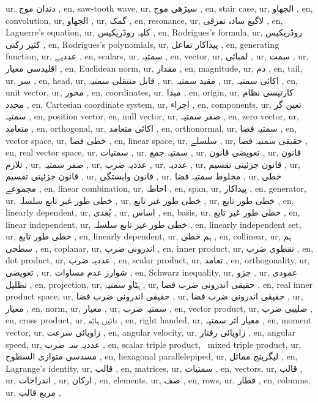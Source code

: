 ur, دندان موج ,
en, saw-tooth wave,
ur, سیڑھی موج ,
en, stair case,
ur, الجھاو ,
en, convolution,
ur, الجھاو ,
ur, گمک ,
en, resonance,
ur, لاگیغ سادہ تفرقی ,
en, Laguerre's equation,
ur, کلیہ روڈریکیس ,
en, Rodrigues's formula,
ur, روڈریکیس کثیر رکنی ,
en, Rodrigues's polynomials,
ur, پیداکار تفاعل ,
en, generating function,
ur, عددیے ,
en, scalars,
ur, سمتیہ ,
en, vector,
ur, لمبائی ,
ur, سمت ,
ur, اقلیدسی معیار ,
en, Euclidean norm,
ur, مقدار ,
en, magnitude,
ur, دم ,
en, tail,
ur, سر ,
en, head,
ur, قابل منتقلی سمتیہ ,
ur, مقید سمتیہ ,
ur, اکائی سمتیہ ,
en, unit vector,
ur, محور ,
en, coordinates,
ur, مبدا ,
en, origin,
ur, کارتیسی نظام محدد ,
en, Cartesian coordinate system,
ur, اجزاء ,
en, components,
ur, تعین گر سمتیہ ,
en, position vector,
en, null vector,
ur, صفر سمتیہ ,
en, zero vector,
ur, متعامد ,
en, orthogonal,
ur,  اکائی متعامد ,
en, orthonormal,
ur, سمتیہ فضا ,
en, vector space,
ur, خطی فضا ,
en, linear space,
ur, سلسلے ,
ur, حقیقی سمتیہ فضا ,
en, real vector space,
ur, سمتیات ,
ur, سمتیہ جمع ,
ur, تعویضی قانون ,
ur, قانون تلازم ,
ur, صفر سمتیہ ,
ur, عددیہ ضرب ,
ur, عددیہ ,
ur, قانون جزئیتی تقسیم ,
ur, قانون جزئیتی تقسیم ,
ur, قانون وابستگی ,
ur, مخلوط سمتیہ فضا ,
ur, خطی مجموعے ,
en, linear combination,
ur, احاطہ ,
en, span,
ur, پیداکار ,
en, generator,
ur, خطی طور غیر تابع سلسلہ ,
ur, خطی طور غیر تابع ,
ur, خطی طور تابع ,
en, linearly dependent,
ur,  بُعدی ,
ur, اساس ,
en, basis,
ur, خطی طور غیر تابع ,
en, linear independent,
ur, خطی طور غیر تابع سلسلہ ,
en, linearly independent set,
ur, خطی طور تابع ,
en, linearly dependent,
ur, ہم خطی ,
en, collinear,
ur, ہم سطحی ,
en, coplanar,
ur, اندرونی ضرب ,
en, inner product,
ur, نقطوی ضرب ,
en, dot product,
ur, عددیہ ضرب ,
en, scalar product,
ur, تعامد ,
en, orthogonality,
ur, تعویضی ,
ur, شوارز عدم مساوات ,
en, Schwarz inequality,
ur, جزو ,
ur, عمودی تظلیل ,
en, projection,
ur, ہٹاو سمتیہ ,
ur, حقیقی اندرونی ضرب فضا ,
en, real inner product space,
ur, حقیقی اندرونی ضرب فضا ,
ur, حقیقی اندرونی ضرب فضا ,
ur, معیار ,
en, norm,
ur, معیار ,
ur, سمتیہ ضرب ,
en, vector product,
ur, صلیبی ضرب ,
en, cross product,
ur, دائیں ہاتھ ,
en, right handed,
ur, معیار اثر سمتیہ ,
en, moment vector,
ur, زاویائی سرعت ,
en, angular velocity,
ur, زاویائی رفتار ,
en, angular speed,
ur, عددیہ سہ ضرب ,
en, scalar triple product, \, mixed triple product,
ur, مسدسی متوازی السطوح ,
en, hexagonal parallelepiped,
ur, لیگرینج مماثل ,
en, Lagrange's identity,
ur, قالب ,
en, matrices,
ur, سمتیات ,
en, vectors,
ur, قالب ,
ur, اندراجات ,
ur, ارکان ,
en, elements,
ur, صف ,
en, rows,
ur, قطار ,
en, columns,
ur, مربع قالب ,
